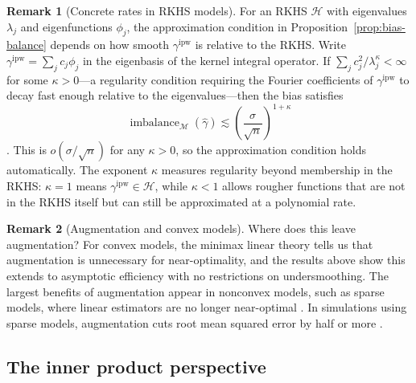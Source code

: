 \documentclass{article}
\theoremstyle{definition}
\newtheorem{remark}{Remark}
\newcommand{\calH}{\ensuremath{\mathcal{H}}}
\newcommand{\ipw}{\text{ipw}}
\DeclareMathOperator{\imbalance}{imbalance}
\newcommand{\hgamma}{\ensuremath{\hat\gamma}}
\newcommand{\gammaipw}{\ensuremath{\gamma^{\ipw}}}
\newcommand{\model}{\mathcal{M}}
\newcommand{\<}{\langle}
\renewcommand{\>}{\rangle}
\begin{document}
\begin{remark}[Concrete rates in RKHS models]
\label{remark:rkhs-rates}
For an RKHS $\calH$ with eigenvalues $\lambda_j$ and eigenfunctions $\phi_j$, the approximation condition in Proposition~\ref{prop:bias-balance} depends on how smooth $\gammaipw$ is relative to the RKHS. Write $\gammaipw = \sum_j c_j \phi_j$ in the eigenbasis of the kernel integral operator. If $\sum_j c_j^2 / \lambda_j^\kappa < \infty$ for some $\kappa > 0$---a regularity condition requiring the Fourier coefficients of $\gammaipw$ to decay fast enough relative to the eigenvalues---then the bias satisfies
\[
  \imbalance_\model(\hgamma) \lesssim \left(\frac{\sigma}{\sqrt{n}}\right)^{1+\kappa}
\]
\citep[Appendix~B]{hirshberg2019minimax}. This is $o(\sigma/\sqrt{n})$ for any $\kappa > 0$, so the approximation condition holds automatically. The exponent $\kappa$ measures regularity beyond membership in the RKHS: $\kappa = 1$ means $\gammaipw \in \calH$, while $\kappa < 1$ allows rougher functions that are not in the RKHS itself but can still be approximated at a polynomial rate.
\end{remark}

\begin{remark}[Augmentation and convex models]
\label{remark:augmentation-convex}
Where does this leave augmentation? For convex models, the minimax linear theory tells us that augmentation is unnecessary for near-optimality, and the results above show this extends to asymptotic efficiency with no restrictions on undersmoothing. The largest benefits of augmentation appear in nonconvex models, such as sparse models, where linear estimators are no longer near-optimal \citep{cai2004minimax}. In simulations using sparse models, augmentation cuts root mean squared error by half or more \citep[Section~6, Setup~2]{hirshberg2021augmented}.
\end{remark}

\subsection{The inner product perspective}%
\label{sec:inner-product}
\end{document}
